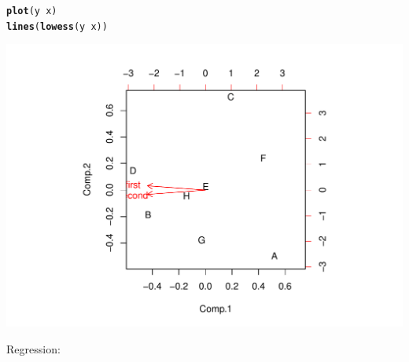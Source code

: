 \documentclass{article}\usepackage[]{graphicx}\usepackage[]{color}
\makeatletter
\def\maxwidth{ %
  \ifdim\Gin@nat@width>\linewidth
    \linewidth
  \else
    \Gin@nat@width
  \fi
}
\newcommand{\hlopt}[1]{\textcolor[rgb]{0,0,0}{#1}}%
\newcommand{\hlstd}[1]{\textcolor[rgb]{0.345,0.345,0.345}{#1}}%
\newcommand{\hlkwd}[1]{\textcolor[rgb]{0.737,0.353,0.396}{\textbf{#1}}}%
\newenvironment{kframe}{%
 \def\at@end@of@kframe{}%
 \ifinner\ifhmode%
  \def\at@end@of@kframe{\end{minipage}}%
  \begin{minipage}{\columnwidth}%
 \fi\fi%
 \def\FrameCommand##1{\hskip\@totalleftmargin \hskip-\fboxsep
 \colorbox{shadecolor}{##1}\hskip-\fboxsep
     \hskip-\linewidth \hskip-\@totalleftmargin \hskip\columnwidth}%
 \MakeFramed {\advance\hsize-\width
   \@totalleftmargin\z@ \linewidth\hsize
   \@setminipage}}%
 {\par\unskip\endMakeFramed%
 \at@end@of@kframe}
\newenvironment{knitrout}{}{} %
\makeatother
\begin{document}
\begin{knitrout}
\color{fgcolor}\begin{kframe}
\begin{alltt}
\hlkwd{plot}\hlstd{(y} \hlopt{~} \hlstd{x)}
\hlkwd{lines}\hlstd{(}\hlkwd{lowess}\hlstd{(y} \hlopt{~} \hlstd{x))}
\end{alltt}
\end{kframe}
\includegraphics[width=\maxwidth]{figure/unnamed-chunk-5} 

\end{knitrout}


Regression:
\end{document}
